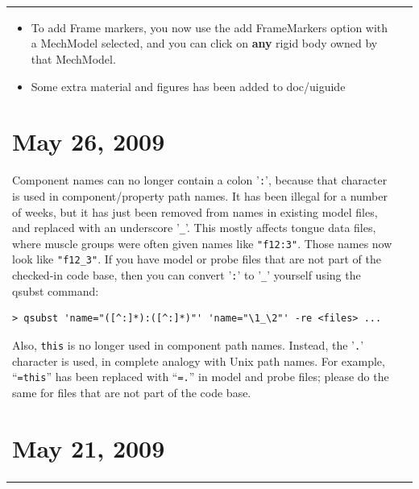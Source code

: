 \documentclass{article}
\begin{document}
\begin{tabular}{ll}
\begin{itemize}
\item To add Frame markers, you now use the {\sf add FrameMarkers} option 
with a MechModel selected, and you can click on {\bf any} rigid body 
owned by that MechModel.

\item Some extra material and figures has been added to doc/uiguide 

\end{itemize}

\section*{May 26, 2009}

Component names can no longer contain a colon '{\tt :}', because that 
character is used in component/property path names. It has been
illegal for a number of weeks, but it has just been removed from names 
in existing model files, and replaced with an underscore '{\tt \_}'.
This mostly affects tongue data files, where muscle groups were often
given names like {\tt "f12:3"}. Those names now look like {\tt "f12\_3"}. If you
have model or probe files that are not part of the checked-in code
base, then you can convert '{\tt :}' to '{\tt \_}' yourself using the qsubst
command: 
%
\begin{verbatim}
> qsubst 'name="([^:]*):([^:]*)"' 'name="\1_\2"' -re <files> ... 
\end{verbatim}
%
Also, {\tt this} is no longer used in component path
names. Instead, the '{\tt .}' character is used, in complete analogy with
Unix path names. For example, ``{\tt =this}'' has been replaced with ``{\tt =.}''
in model and probe files; please do the same for files that are not part
of the code base. 

\section*{May 21, 2009}


\end{tabular}
\end{document}
